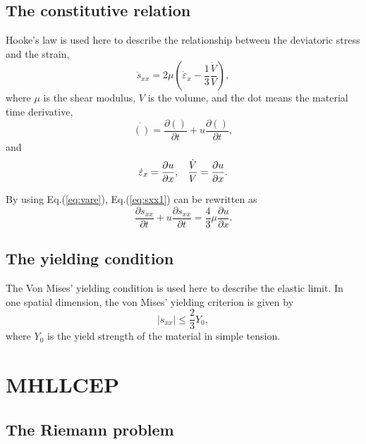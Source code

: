 \documentclass[review]{elsarticle}
\begin{document}
\subsection{The constitutive relation}
Hooke's law is used here to describe the relationship between the deviatoric stress and the strain,
\begin{equation}\label{eq:sxx1}
\dot{s}_{xx} = 2\mu \left(\dot{\varepsilon}_x-\frac{1}{3}\frac{\dot{V}}{V}\right),
\end{equation}
where $\mu$ is the shear modulus, $V$ is the volume, and the dot means the material time derivative,
\begin{equation}\label{eq:mt}
  \dot{()} = \frac{\partial ()}{\partial t} + u \frac{\partial ()}{\partial t},
\end{equation}
and
\begin{equation}\label{eq:vare}
  \dot{\varepsilon}_x = \frac{\partial u}{\partial x}, \hspace{0.3cm} \frac{\dot{V}}{V} = \frac{\partial u}{\partial x}.
\end{equation}

By using Eq.(\ref{eq:vare}), Eq.(\ref{eq:sxx1}) can be rewritten as
\begin{equation}\label{eq:sxx}
  \frac{\partial s_{xx}}{\partial t} + u \frac{\partial s_{xx}}{\partial t} =\frac{4}{3}\mu \frac{\partial u}{\partial x}.
\end{equation}

\subsection{The yielding condition}
The Von Mises' yielding condition is used here to describe the elastic limit. In one spatial dimension, the von Mises' yielding criterion is given by
\begin{equation}
  |s_{xx}| \le \frac{2}{3}Y_0,
\end{equation}
where $Y_0$ is the yield strength of the material in simple tension.

\section{MHLLCEP}\label{sec:HLLCEP}
\subsection{The Riemann problem}
\end{document}
